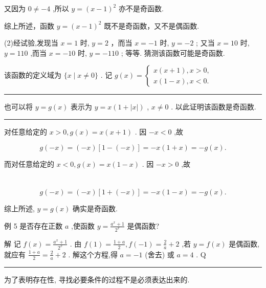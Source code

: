 \documentclass[10pt]{article}
\newcommand{\HRule}{\begin{center}\rule{0.9\linewidth}{0.2mm}\end{center}}
\begin{document}
又因为 \(0 \neq   - 4\) ,所以 \(y = {\left( x - 1\right) }^{2}\) 亦不是奇函数.

综上所述，函数 \(y = {\left( x - 1\right) }^{2}\) 既不是奇函数，又不是偶函数.

(2)经试验,发现当 \(x = 1\) 时, \(y = 2\) ，而当 \(x =  - 1\) 时, \(y =  - 2\) ; 又当 \(x = {10}\) 时, \(y = {110}\) ,而当 \(x =  - {10}\) 时, \(y =  - {110}\) ; 等等. 猜测该函数可能是奇函数.

该函数的定义域为 \(\{ x \mid  x \neq  0\}\) . 记 \(g\left( x\right)  = \left\{  \begin{array}{l} x\left( {x + 1}\right) ,x > 0, \\  x\left( {1 - x}\right) ,x < 0. \end{array}\right.\)

\HRule

也可以将 \(y = g\left( x\right)\) 表示为 \(y = x\left( {1 + \left| x\right| }\right)\) , \(x \neq  0\) . 以此证明该函数是奇函数.

\HRule

对任意给定的 \(x > 0,g\left( x\right)  = x\left( {x + 1}\right)\) . 因 \(- x < 0\) ,故

\[
g\left( {-x}\right)  = \left( {-x}\right) \left\lbrack  {1 - \left( {-x}\right) }\right\rbrack   =  - x\left( {1 + x}\right)  =  - g\left( x\right) .
\]

而对任意给定的 \(x < 0,g\left( x\right)  = x\left( {1 - x}\right)\) . 因 \(- x > 0\) ,故

\section*{}

\[
g\left( {-x}\right)  = \left( {-x}\right) \left\lbrack  {1 + \left( {-x}\right) }\right\rbrack   =  - x\left( {1 - x}\right)  =  - g\left( x\right) .
\]

综上所述, \(y = g\left( x\right)\) 确实是奇函数.

例 5 是否存在正数 \(a\) ,使函数 \(y = \frac{{a}^{x} + 1}{{2}^{x}}\) 是偶函数?

解 记 \(f\left( x\right)  = \frac{{a}^{x} + 1}{{2}^{x}}\) . 由 \(f\left( 1\right)  = \frac{1 + a}{2},f\left( {-1}\right)  = \frac{2}{a} + 2\) ,若 \(y = f\left( x\right)\) 是偶函数,就应有 \(\frac{1 + a}{2} = \frac{2}{a} + 2\) . 解这个方程,得 \(a =  - 1\) (舍去) 或 \(a = 4\) . Q

\HRule

为了表明存在性, 寻找必要条件的过程不是必须表达出来的.
\end{document}
